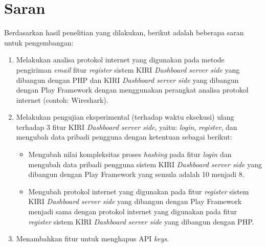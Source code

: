 \section{Saran}
\label{sec:saran}
Berdasarkan hasil penelitian yang dilakukan, berikut adalah beberapa saran untuk pengembangan:
\begin{enumerate}
	\item Melakukan analisa protokol internet yang digunakan pada metode pengiriman \textit{email} fitur \textit{register} sistem KIRI \textit{Dashboard server side} yang dibangun dengan PHP dan KIRI \textit{Dashboard server side} yang dibangun dengan Play Framework dengan menggunakan perangkat analisa protokol internet (contoh: Wireshark).
	\item Melakukan pengujian eksperimental (terhadap waktu eksekusi) ulang terhadap 3 fitur KIRI \textit{Dashboard server side}, yaitu: \textit{login}, \textit{register}, dan mengubah data pribadi pengguna dengan ketentuan sebagai berikut:
	\begin{itemize}
		\item Mengubah nilai kompleksitas proses \textit{hashing} pada fitur \textit{login} dan mengubah data pribadi pengguna sistem KIRI \textit{Dashboard server side} yang dibangun dengan Play Framework yang semula adalah 10 menjadi 8.
		\item Mengubah protokol internet yang digunakan pada fitur \textit{register} sistem KIRI \textit{Dashboard server side} yang dibangun dengan Play Framework menjadi sama dengan protokol internet yang digunakan pada fitur \textit{register} sistem KIRI \textit{Dashboard server side} yang dibangun dengan PHP.
	\end{itemize}
	\item Menambahkan fitur untuk menghapus API \textit{keys}.
\end{enumerate}